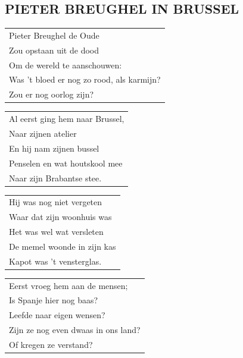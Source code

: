 \documentclass[a4paper, 14pt]{extarticle}
\begin{document}
\subsection*{PIETER BREUGHEL IN BRUSSEL}
\begin{flushleft}
\begin{tabularx}{0.8\textwidth} {
   >{\raggedright\arraybackslash}X}
   Pieter Breughel de Oude\\
Zou opstaan uit de dood\\
Om de wereld te aanschouwen:\\
Was ’t bloed er nog zo rood, als karmijn?\\
Zou er nog oorlog zijn?\\
\end{tabularx}
\end{flushleft}\begin{flushleft}
\begin{tabularx}{0.8\textwidth} {
   >{\raggedright\arraybackslash}X}
Al eerst ging hem naar Brussel,\\
Naar zijnen atelier\\
En hij nam zijnen bussel\\
Penselen en wat houtskool mee\\
Naar zijn Brabantse stee.\\
\end{tabularx}
\end{flushleft}\begin{flushleft}
\begin{tabularx}{0.8\textwidth} {
   >{\raggedright\arraybackslash}X}
Hij was nog niet vergeten\\
Waar dat zijn woonhuis was\\
Het was wel wat versleten\\
De memel woonde in zijn kas\\
Kapot was ’t vensterglas.\\
\end{tabularx}
\end{flushleft}\begin{flushleft}
\begin{tabularx}{0.8\textwidth} {
   >{\raggedright\arraybackslash}X}
Eerst vroeg hem aan de mensen;\\
Is Spanje hier nog baas?\\
Leefde naar eigen wensen?\\
Zijn ze nog even dwaas in ons land?\\
Of kregen ze verstand?\\

\end{tabularx}
\end{flushleft}
\end{document}
